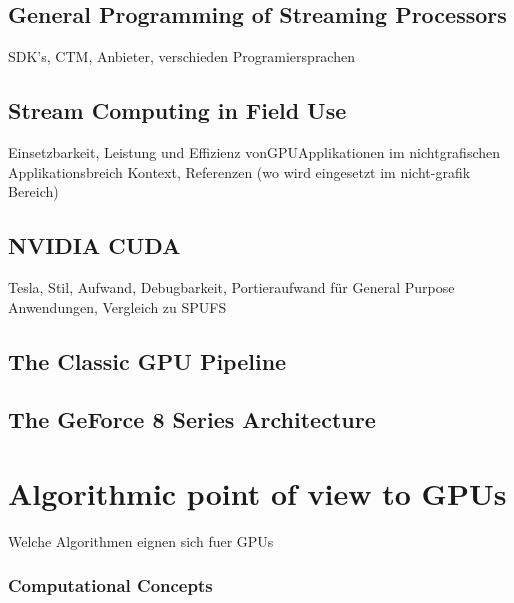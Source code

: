 \subsection{General Programming of Streaming Processors} %
\label{sub:programming_streaming_processors}
SDK's, CTM, Anbieter, verschieden Programiersprachen

\subsection{Stream Computing in Field Use} %
\label{sub:stream_computing_in_use}
Einsetzbarkeit, Leistung und Effizienz von\gls{GPU}Applikationen im nichtgrafischen Applikationsbreich Kontext, Referenzen (wo wird eingesetzt im nicht-grafik
Bereich)

\subsection{NVIDIA CUDA} %
\label{sub:nvidia_cuda}
Tesla, Stil, Aufwand, Debugbarkeit, Portieraufwand für 
General Purpose Anwendungen, Vergleich zu SPUFS

\subsection{The Classic GPU Pipeline} %
\label{sub:the_classic_gpu_pipeline}

\subsection{The GeForce 8 Series Architecture} %
\label{sub:the_geforce_8_series_architecture}


\section{Algorithmic point of view to GPUs} %
\label{sec:algorithmic_view_to_gpus}
Welche Algorithmen eignen sich fuer GPUs
\subsubsection{Computational Concepts} %
\label{ssub:computational_concepts}


